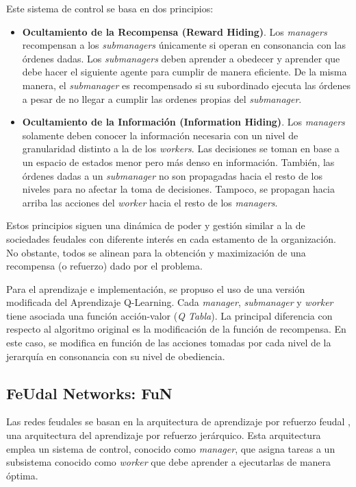 \documentclass[letterpaper]{article} %
\begin{document}
Este sistema de control se basa en dos principios:
\begin{itemize}
    \item \textbf{Ocultamiento de la Recompensa (Reward Hiding)}. Los \textit{managers} recompensan a los \textit{submanagers} únicamente si operan 
    en consonancia con las órdenes dadas. Los \textit{submanagers} deben aprender a obedecer y aprender que debe hacer el siguiente agente para 
    cumplir de manera eficiente. De la misma manera, el \textit{submanager} es recompensado si su subordinado ejecuta las órdenes a pesar de no llegar a cumplir 
    las ordenes propias del \textit{submanager}.

    \item \textbf{Ocultamiento de la Información (Information Hiding)}. Los \textit{managers} solamente deben conocer la información necesaria 
    con un nivel de granularidad distinto a la de los \textit{workers}. Las decisiones se toman en base a un espacio de estados menor pero más
    denso en información. También, las órdenes dadas a un \textit{submanager} no son propagadas hacia el resto de los niveles para no afectar la toma
    de decisiones. Tampoco, se propagan hacia arriba las acciones del \textit{worker} hacia el resto de los \textit{managers}. 
\end{itemize}

Estos principios siguen una dinámica de poder y gestión similar a la de sociedades feudales con diferente interés en cada estamento de la organización.
No obstante, todos se alinean para la obtención y maximización de una recompensa (o refuerzo) dado por el problema.

Para el aprendizaje e implementación, se propuso el uso de una versión modificada del Aprendizaje Q-Learning. Cada \textit{manager}, \textit{submanager} y
\textit{worker} tiene asociada una función acción-valor (\textit{Q Tabla}). La principal diferencia con respecto al algoritmo original es la 
modificación de la función de recompensa. En este caso, se modifica en función de las acciones tomadas por cada nivel de la jerarquía en consonancia 
con su nivel de obediencia. 

\subsection{FeUdal Networks: FuN}

Las redes feudales se basan en la arquitectura de aprendizaje por refuerzo feudal \cite{vezhnevets2017feudal}, 
una arquitectura del aprendizaje por refuerzo jerárquico. Esta arquitectura emplea un sistema de control, conocido
como \textit{manager}, que asigna tareas a un subsistema conocido como \textit{worker} que debe aprender a ejecutarlas de manera óptima.
\end{document}
